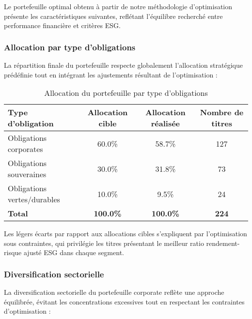 Le portefeuille optimal obtenu à partir de notre méthodologie d'optimisation présente les caractéristiques suivantes, reflétant l'équilibre recherché entre performance financière et critères ESG.

\subsubsection{Allocation par type d'obligations}

La répartition finale du portefeuille respecte globalement l'allocation stratégique prédéfinie tout en intégrant les ajustements résultant de l'optimisation :

\begin{table}[h!]
\centering
\begin{tabular}{lccc}
\hline
\textbf{Type d'obligation} & \textbf{Allocation cible} & \textbf{Allocation réalisée} & \textbf{Nombre de titres} \\
\hline
Obligations corporates & 60.0\% & 58.7\% & 127 \\
Obligations souveraines & 30.0\% & 31.8\% & 73 \\
Obligations vertes/durables & 10.0\% & 9.5\% & 24 \\
\hline
\textbf{Total} & \textbf{100.0\%} & \textbf{100.0\%} & \textbf{224} \\
\hline
\end{tabular}
\caption{Allocation du portefeuille par type d'obligations}
\end{table}

Les légers écarts par rapport aux allocations cibles s'expliquent par l'optimisation sous contraintes, qui privilégie les titres présentant le meilleur ratio rendement-risque ajusté ESG dans chaque segment.

\subsubsection{Diversification sectorielle}

La diversification sectorielle du portefeuille corporate reflète une approche équilibrée, évitant les concentrations excessives tout en respectant les contraintes d'optimisation :

